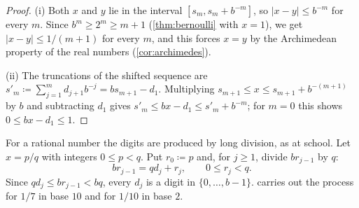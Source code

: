 \begin{proof}
(i) Both $x$ and $y$ lie in the interval $[s_m,s_m+b^{-m}]$, so $|x-y|\le b^{-m}$ for every $m$. Since $b^m\ge2^m\ge m+1$ (\cref{thm:bernoulli} with $x=1$), we get $|x-y|\le1/(m+1)$ for every $m$, and this forces $x=y$ by the Archimedean property of the real numbers (\cref{cor:archimedes}).

(ii) The truncations of the shifted sequence are $s'_m\coloneqq\sum_{j=1}^md_{j+1}b^{-j}=bs_{m+1}-d_1$. Multiplying $s_{m+1}\le x\le s_{m+1}+b^{-(m+1)}$ by $b$ and subtracting $d_1$ gives $s'_m\le bx-d_1\le s'_m+b^{-m}$; for $m=0$ this shows $0\le bx-d_1\le1$.
\end{proof}

For a rational number the digits are produced by long division, as at school. Let $x=p/q$ with integers $0\le p<q$. Put $r_0\coloneqq p$ and, for $j\ge1$, divide $br_{j-1}$ by $q$:
\begin{equation}
br_{j-1}=qd_j+r_j,\qquad0\le r_j<q .
\label{eq:long-division}
\end{equation}
Since $qd_j\le br_{j-1}<bq$, every $d_j$ is a digit in $\{0,\ldots,b-1\}$.  carries out the process for $1/7$ in base $10$ and for $1/10$ in base $2$.

\begin{table}
\end{table}

